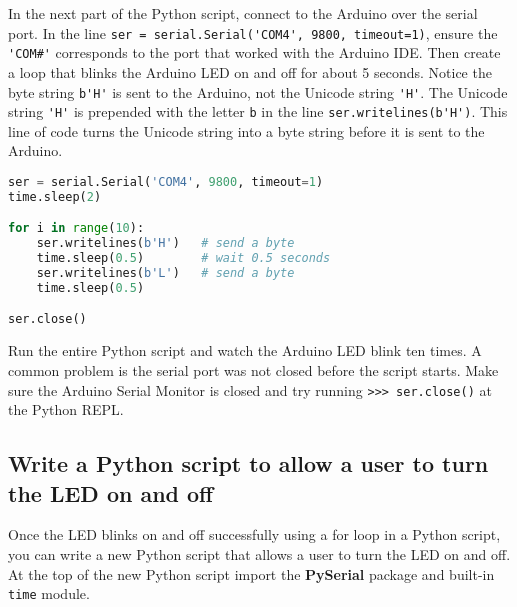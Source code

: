 \documentclass{book}
\newcommand{\passthrough}[1]{#1}
\begin{document}
    
        In the next part of the Python script, connect to the Arduino over the
serial port. In the line
\passthrough{\lstinline!ser = serial.Serial('COM4', 9800, timeout=1)!},
ensure the \passthrough{\lstinline!'COM#'!} corresponds to the port that
worked with the Arduino IDE. Then create a loop that blinks the Arduino
LED on and off for about 5 seconds. Notice the byte string
\passthrough{\lstinline!b'H'!} is sent to the Arduino, not the Unicode
string \passthrough{\lstinline!'H'!}. The Unicode string
\passthrough{\lstinline!'H'!} is prepended with the letter
\passthrough{\lstinline!b!} in the line
\passthrough{\lstinline!ser.writelines(b'H')!}. This line of code turns
the Unicode string into a byte string before it is sent to the Arduino.
    




    
        \begin{lstlisting}[language=Python]
ser = serial.Serial('COM4', 9800, timeout=1)
time.sleep(2)

for i in range(10):
    ser.writelines(b'H')   # send a byte
    time.sleep(0.5)        # wait 0.5 seconds
    ser.writelines(b'L')   # send a byte
    time.sleep(0.5)

ser.close()
\end{lstlisting}
    




    
        Run the entire Python script and watch the Arduino LED blink ten times.
A common problem is the serial port was not closed before the script
starts. Make sure the Arduino Serial Monitor is closed and try running
\passthrough{\lstinline!>>> ser.close()!} at the Python REPL.
    




    
        \hypertarget{write-a-python-script-to-allow-a-user-to-turn-the-led-on-and-off}{%
\subsection{Write a Python script to allow a user to turn the LED on and
off}\label{write-a-python-script-to-allow-a-user-to-turn-the-led-on-and-off}}
    




    
        Once the LED blinks on and off successfully using a for loop in a Python
script, you can write a new Python script that allows a user to turn the
LED on and off. At the top of the new Python script import the
\textbf{PySerial} package and built-in \passthrough{\lstinline!time!}
module.
    
\end{document}
